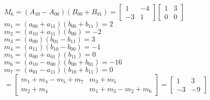 \documentclass[letterpaper,10pt]{article}
\begin{document}
\begin{flushleft}
$M_6=(A_{10}-A_{00})(B_{00}+B_{01})=
\left[ 
	\begin{array}{cc}
		1 & -4\\
		-3 & 1 
	\end{array} 
\right]
\left[ 
	\begin{array}{cc}
		1 & 3\\
		0 & 0 
	\end{array} 
\right]$\\
	$m_1=(a_{00}+a_{11})(b_{00}+b_{11})=2$\\
	$m_2=(a_{10}+a_{11})(b_{00})=-2$\\
	$m_3=(a_{00})(b_{01}-b_{11})=3$\\
	$m_4=(a_{11})(b_{10}-b_{00})=-1$\\
	$m_5=(a_{00}+a_{01})(b_{11})=0$\\
	$m_6=(a_{10}-a_{00})(b_{00}+b_{01})=-16$\\
	$m_7=(a_{01}-a_{11})(b_{10}+b_{11})=0$\\
$=
\left[ 
	\begin{array}{cc}
		m_1+m_4-m_5+m_7 & m_3+m_5\\
		m_2+m_4 & m_1+m_3-m_2+m_6 
	\end{array} 
\right]	=
	\left[ 
		\begin{array}{cc}
			1 & 3\\
			-3 & -9 
		\end{array} 
	\right]$\\
~\\


\end{flushleft}
\end{document}
